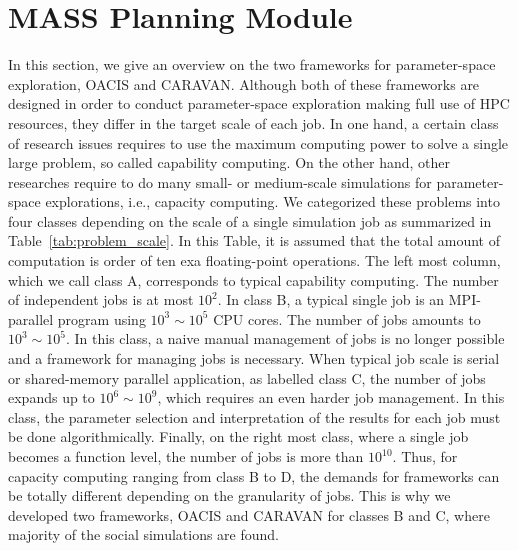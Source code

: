 \section{MASS Planning Module}
\label{s:MASS Planning Module}

In this section, we give an overview on the two frameworks for parameter-space exploration, OACIS and CARAVAN.
Although both of these frameworks are designed in order to conduct parameter-space exploration making full use of HPC resources, they differ in the target scale of each job.
In one hand, a certain class of research issues requires to use the maximum computing power to solve a single large problem, so called capability computing.
On the other hand, other researches require to do many small- or medium-scale simulations for parameter-space explorations, i.e., capacity computing.
We categorized these problems into four classes depending on the scale of a single simulation job as summarized in Table~\ref{tab:problem_scale}.
In this Table, it is assumed that the total amount of computation is order of ten exa floating-point operations.
The left most column, which we call class A, corresponds to typical capability computing. The number of independent jobs is at most $10^2$.
In class B, a typical single job is an MPI-parallel program using $10^3 \sim 10^5$ CPU cores. The number of jobs amounts to $10^3 \sim 10^5$.
In this class, a naive manual management of jobs is no longer possible and a framework for managing jobs is necessary.
When typical job scale is serial or shared-memory parallel application, as labelled class C, the number of jobs expands up to $10^6 \sim 10^9$, which requires an even harder job management.
In this class, the parameter selection and interpretation of the results for each job must be done algorithmically.
Finally, on the right most class, where a single job becomes a function level, the number of jobs is more than $10^{10}$.
Thus, for capacity computing ranging from class B to D, the demands for frameworks can be totally different depending on the granularity of jobs.
This is why we developed two frameworks, OACIS and CARAVAN for classes B and C, where majority of the social simulations are found.


